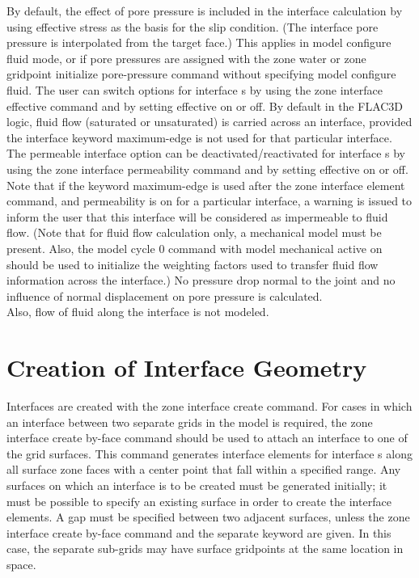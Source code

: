 \documentclass[a4paper, nobind]{templates/ociamthesis}
\begin{document}
By default, the effect of pore pressure is included in the interface calculation by using effective stress as the basis for the slip condition. (The interface pore pressure is interpolated from the target face.) This applies in model configure fluid mode, or if pore pressures are assigned with the zone water or zone gridpoint initialize pore-pressure command without specifying model configure fluid. The user can switch options for interface s by using the zone interface effective command and by setting effective on or off. By default in the FLAC3D logic, fluid flow (saturated or unsaturated) is carried across an interface, provided the interface keyword maximum-edge is not used for that particular interface. The permeable interface option can be deactivated/reactivated for interface s by using the zone interface permeability command and by setting effective on or off. Note that if the keyword maximum-edge is used after the zone interface element command, and permeability is on for a particular interface, a warning is issued to inform the user that this interface will be considered as impermeable to fluid flow. (Note that for fluid flow calculation only, a mechanical model must be present. Also, the model cycle 0 command with model mechanical active on should be used to initialize the weighting factors used to transfer fluid flow information across the interface.) No pressure drop normal to the joint and no influence of normal displacement on pore pressure is calculated.\\

Also, flow of fluid along the interface is not modeled.\\

\hypertarget{creation-of-interface-geometry}{%
\section{Creation of Interface Geometry}\label{creation-of-interface-geometry}}

Interfaces are created with the zone interface create command. For cases in which an interface between two separate grids in the model is required, the zone interface create by-face command should be used to attach an interface to one of the grid surfaces. This command generates interface elements for interface s along all surface zone faces with a center point that fall within a specified range. Any surfaces on which an interface is to be created must be generated initially; it must be possible to specify an existing surface in order to create the interface elements. A gap must be specified between two adjacent surfaces, unless the zone interface create by-face command and the separate keyword are given. In this case, the separate sub-grids may have surface gridpoints at the same location in space.\\
\end{document}
